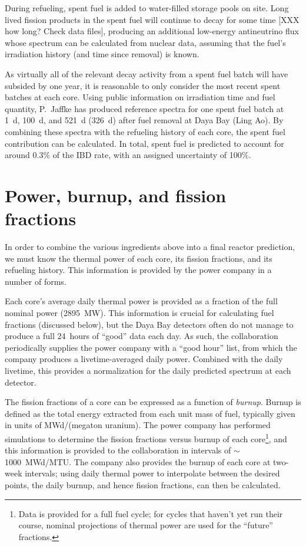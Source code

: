 \documentclass[../thesis.tex]{subfiles}
\begin{document}
During refueling, spent fuel is added to water-filled storage pools on site. Long lived fission products in the spent fuel will continue to decay for some time [XXX how long? Check data files], producing an additional low-energy antineutrino flux whose spectrum can be calculated from nuclear data, assuming that the fuel's irradiation history (and time since removal) is known. 

As virtually all of the relevant decay activity from a spent fuel batch will have subsided by one year, it is reasonable to only consider the most recent spent batches at each core. Using public information on irradiation time and fuel quantity, P.~Jaffke has produced reference spectra for one spent fuel batch at 1~d, 100~d, and 521~d (326~d) after fuel removal at Daya Bay (Ling Ao). By combining these spectra with the refueling history of each core, the spent fuel contribution can be calculated. In total, spent fuel is predicted to account for around 0.3\% of the IBD rate, with an assigned uncertainty of 100\%.

\section{Power, burnup, and fission fractions}
\label{sec:reacpow}

In order to combine the various ingredients above into a final reactor prediction, we must know the thermal power of each core, its fission fractions, and its refueling history. This information is provided by the power company in a number of forms.

Each core's average daily thermal power is provided as a fraction of the full nominal power (2895~MW). This information is crucial for calculating fuel fractions (discussed below), but the Daya Bay detectors often do not manage to produce a full 24~hours of ``good'' data each day. As such, the collaboration periodically supplies the power company with a ``good hour'' list, from which the company produces a livetime-averaged daily power. Combined with the daily livetime, this provides a normalization for the daily predicted spectrum at each detector.

The fission fractions of a core can be expressed as a function of \emph{burnup}. Burnup is defined as the total energy extracted from each unit mass of fuel, typically given in units of MWd/(megaton uranium). The power company has performed simulations to determine the fission fractions versus burnup of each core\footnote{Data is provided for a full fuel cycle; for cycles that haven't yet run their course, nominal projections of thermal power are used for the ``future'' fractions.}, and this information is provided to the collaboration in intervals of $\sim$1000~MWd/MTU. The company also provides the burnup of each core at two-week intervals; using daily thermal power to interpolate between the desired points, the daily burnup, and hence fission fractions, can then be calculated.
\end{document}
